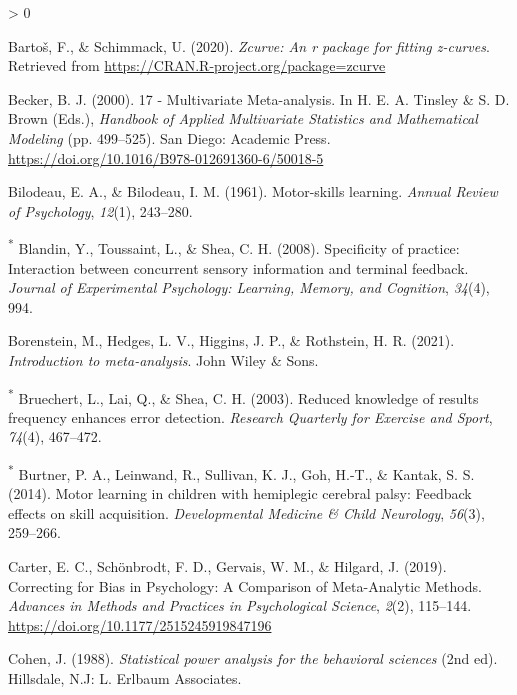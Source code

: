 \documentclass[
  english,
  man, donotrepeattitle,mask,floatsintext]{apa7}
\newlength{\cslhangindent}
\newenvironment{CSLReferences}[2] %
 {%
  \setlength{\parindent}{0pt}
  \ifodd #1 \everypar{\setlength{\hangindent}{\cslhangindent}}\ignorespaces\fi
  \ifnum #2 > 0
  \setlength{\parskip}{#2\baselineskip}
  \fi
 }%
 {}
\begin{document}
\begin{CSLReferences}{1}{0}
\leavevmode\hypertarget{ref-Bartoux1612020}{}%
Bartoš, F., \& Schimmack, U. (2020). \emph{Zcurve: An r package for fitting z-curves}. Retrieved from \url{https://CRAN.R-project.org/package=zcurve}

\leavevmode\hypertarget{ref-Becker2000}{}%
Becker, B. J. (2000). 17 - {Multivariate} {Meta}-analysis. In H. E. A. Tinsley \& S. D. Brown (Eds.), \emph{Handbook of {Applied} {Multivariate} {Statistics} and {Mathematical} {Modeling}} (pp. 499--525). San Diego: Academic Press. \url{https://doi.org/10.1016/B978-012691360-6/50018-5}

\leavevmode\hypertarget{ref-Bilodeau1961}{}%
Bilodeau, E. A., \& Bilodeau, I. M. (1961). Motor-skills learning. \emph{Annual Review of Psychology}, \emph{12}(1), 243--280.

\leavevmode\hypertarget{ref-Blandin2008}{}%
\textsuperscript{*} Blandin, Y., Toussaint, L., \& Shea, C. H. (2008). Specificity of practice: Interaction between concurrent sensory information and terminal feedback. \emph{Journal of Experimental Psychology: Learning, Memory, and Cognition}, \emph{34}(4), 994.

\leavevmode\hypertarget{ref-Borenstein2021}{}%
Borenstein, M., Hedges, L. V., Higgins, J. P., \& Rothstein, H. R. (2021). \emph{Introduction to meta-analysis}. John Wiley \& Sons.

\leavevmode\hypertarget{ref-Bruechert2003}{}%
\textsuperscript{*} Bruechert, L., Lai, Q., \& Shea, C. H. (2003). Reduced knowledge of results frequency enhances error detection. \emph{Research Quarterly for Exercise and Sport}, \emph{74}(4), 467--472.

\leavevmode\hypertarget{ref-Burtner2014}{}%
\textsuperscript{*} Burtner, P. A., Leinwand, R., Sullivan, K. J., Goh, H.-T., \& Kantak, S. S. (2014). Motor learning in children with hemiplegic cerebral palsy: Feedback effects on skill acquisition. \emph{Developmental Medicine \& Child Neurology}, \emph{56}(3), 259--266.

\leavevmode\hypertarget{ref-Carter2019}{}%
Carter, E. C., Schönbrodt, F. D., Gervais, W. M., \& Hilgard, J. (2019). Correcting for {Bias} in {Psychology}: {A} {Comparison} of {Meta}-{Analytic} {Methods}. \emph{Advances in Methods and Practices in Psychological Science}, \emph{2}(2), 115--144. \url{https://doi.org/10.1177/2515245919847196}

\leavevmode\hypertarget{ref-Cohen1988}{}%
Cohen, J. (1988). \emph{Statistical power analysis for the behavioral sciences} (2nd ed). Hillsdale, N.J: L. Erlbaum Associates.


\end{CSLReferences}
\end{document}
